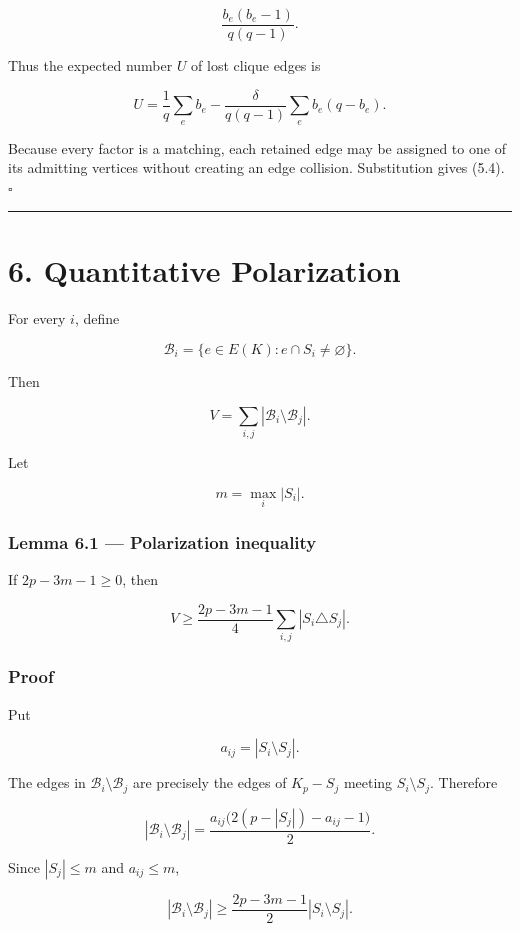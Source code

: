 \documentclass[
  11pt,
]{article}
\begin{document}
\[
\frac{b_e(b_e-1)}{q(q-1)}.
\]

Thus the expected number \(U\) of lost clique edges is

\[
U
=
\frac1q\sum_e b_e
-
\frac{\delta}{q(q-1)}\sum_e b_e(q-b_e).
\]

Because every factor is a matching, each retained edge may be assigned to one of its admitting vertices without creating an edge collision. Substitution gives (5.4). \(\square\)

\begin{center}\rule{0.5\linewidth}{0.5pt}\end{center}

\section{6. Quantitative Polarization}\label{quantitative-polarization}

For every \(i\), define

\[
\mathcal B_i=\{e\in E(K):e\cap S_i\ne\varnothing\}.
\]

Then

\[
V=\sum_{i,j}|\mathcal B_i\setminus\mathcal B_j|.
\tag{6.1}
\]

Let

\[
m=\max_i|S_i|.
\]

\subsubsection{Lemma 6.1 --- Polarization inequality}\label{lemma-6.1-polarization-inequality}

If \(2p-3m-1\ge0\), then

\[
\boxed{
V
\ge
\frac{2p-3m-1}{4}
\sum_{i,j}|S_i\triangle S_j|.
}
\tag{6.2}
\]

\subsubsection{Proof}\label{proof-5}

Put

\[
a_{ij}=|S_i\setminus S_j|.
\]

The edges in \(\mathcal B_i\setminus\mathcal B_j\) are precisely the edges of \(K_p-S_j\) meeting \(S_i\setminus S_j\). Therefore

\[
|\mathcal B_i\setminus\mathcal B_j|
=
\frac{a_{ij}\bigl(2(p-|S_j|)-a_{ij}-1\bigr)}2.
\]

Since \(|S_j|\le m\) and \(a_{ij}\le m\),

\[
|\mathcal B_i\setminus\mathcal B_j|
\ge
\frac{2p-3m-1}{2}|S_i\setminus S_j|.
\]
\end{document}
